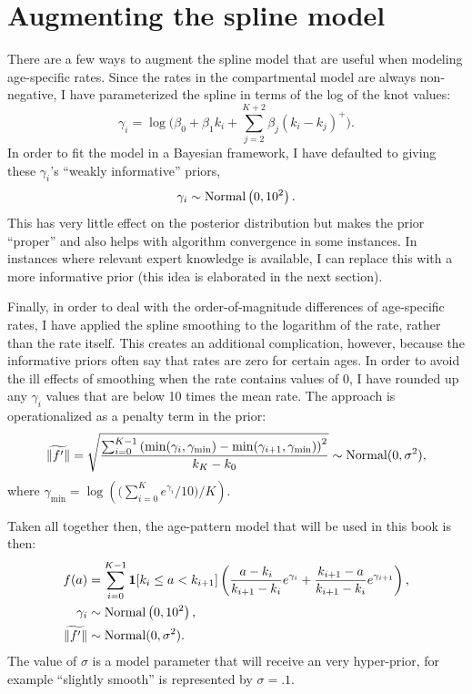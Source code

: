 \section{Augmenting the spline model}
There are a few ways to augment the spline model that are useful when
modeling age-specific rates. Since the rates in the compartmental
model are always non-negative, I have parameterized the spline in
terms of the log of the knot values:
\[
\gamma_i = \log\bigg(\beta_0 + \beta_1 k_i + \sum_{j=2}^{K+2} \beta_j (k_i-k_j)^+\bigg).
\]
In order to fit the model in a Bayesian framework, I have defaulted to
giving these $\gamma_i$'s ``weakly informative'' priors,
\[
\gamma_i \sim \operatorname{Normal}\left(0, 10^2\right).
\]
This has very little effect on the posterior distribution but makes
the prior ``proper'' and also helps with algorithm convergence in
some instances. In instances where relevant expert knowledge is
available, I can replace this with a more informative prior (this idea
is elaborated in the next section).

Finally, in order to deal with the order-of-magnitude differences of
age-specific rates, I have applied the spline smoothing to the
logarithm of the rate, rather than the rate itself.  This creates an additional
complication, however, because the informative priors often say that
rates are zero for certain ages.  In order to avoid the ill effects of
smoothing when the rate contains values of $0$, I have
rounded up any $\gamma_i$ values that are below 10 times the mean
rate.  The approach is operationalized as a penalty term in the prior:
\[
\widetilde{\|f'\|} = \sqrt{\frac{\sum_{i=0}^{K-1} 
\left(\min(\gamma_i, \gamma_{\min})
-
\min(\gamma_{i+1}, \gamma_{\min})\right)^2
}{k_K-k_0} } \sim \operatorname{Normal}(0, \sigma^2),
\]
where $\gamma_{\min} = \log\left(\bigg(\sum_{i=0}^K e^{\gamma_i}/10\bigg)
/ K\right)$.


Taken all together then, the age-pattern model that will be used in this
book is then:
\begin{align*}
f(a) &= \sum_{i=0}^{K-1} \mathbf{1}[k_i \leq a < k_{i+1}]\left( \frac{a-k_i}{k_{i+1}-k_i} e^{\gamma_i} + \frac{k_{i+1}-a}{k_{i+1}-k_i} e^{\gamma_{i+1}}\right),\\
\gamma_i &\sim \operatorname{Normal}\left(0, 10^2\right),\\
\widetilde{\|f'\|} &\sim \operatorname{Normal}(0, \sigma^2).\\
\end{align*}
The value of $\sigma$ is a model parameter that will
receive an very hyper-prior, for example ``slightly smooth'' is represented by $\sigma=.1$.




